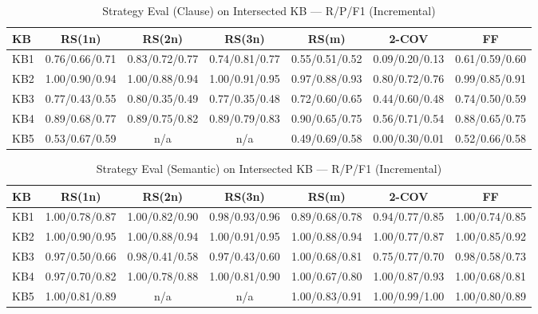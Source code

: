 \begin{table}[htbp]
\centering
\caption{Strategy Eval (Clause) on Intersected KB — R/P/F1 (Incremental)}
\label{tab:eval_clause_incremental}
\begin{tabular}{lcccccc}
\toprule
KB & RS(1n) & RS(2n) & RS(3n) & RS(m) & 2-COV & FF \\
\midrule
KB1 & 0.76/0.66/0.71 & 0.83/0.72/0.77 & 0.74/0.81/0.77 & 0.55/0.51/0.52 & 0.09/0.20/0.13 & 0.61/0.59/0.60 \\
KB2 & 1.00/0.90/0.94 & 1.00/0.88/0.94 & 1.00/0.91/0.95 & 0.97/0.88/0.93 & 0.80/0.72/0.76 & 0.99/0.85/0.91 \\
KB3 & 0.77/0.43/0.55 & 0.80/0.35/0.49 & 0.77/0.35/0.48 & 0.72/0.60/0.65 & 0.44/0.60/0.48 & 0.74/0.50/0.59 \\
KB4 & 0.89/0.68/0.77 & 0.89/0.75/0.82 & 0.89/0.79/0.83 & 0.90/0.65/0.75 & 0.56/0.71/0.54 & 0.88/0.65/0.75 \\
KB5 & 0.53/0.67/0.59 & n/a & n/a & 0.49/0.69/0.58 & 0.00/0.30/0.01 & 0.52/0.66/0.58 \\
\bottomrule
\end{tabular}
\end{table}

\begin{table}[htbp]
\centering
\caption{Strategy Eval (Semantic) on Intersected KB — R/P/F1 (Incremental)}
\label{tab:eval_semantic_incremental}
\begin{tabular}{lcccccc}
\toprule
KB & RS(1n) & RS(2n) & RS(3n) & RS(m) & 2-COV & FF \\
\midrule
KB1 & 1.00/0.78/0.87 & 1.00/0.82/0.90 & 0.98/0.93/0.96 & 0.89/0.68/0.78 & 0.94/0.77/0.85 & 1.00/0.74/0.85 \\
KB2 & 1.00/0.90/0.95 & 1.00/0.88/0.94 & 1.00/0.91/0.95 & 1.00/0.88/0.94 & 1.00/0.77/0.87 & 1.00/0.85/0.92 \\
KB3 & 0.97/0.50/0.66 & 0.98/0.41/0.58 & 0.97/0.43/0.60 & 1.00/0.68/0.81 & 0.75/0.77/0.70 & 0.98/0.58/0.73 \\
KB4 & 0.97/0.70/0.82 & 1.00/0.78/0.88 & 1.00/0.81/0.90 & 1.00/0.67/0.80 & 1.00/0.87/0.93 & 1.00/0.68/0.81 \\
KB5 & 1.00/0.81/0.89 & n/a & n/a & 1.00/0.83/0.91 & 1.00/0.99/1.00 & 1.00/0.80/0.89 \\
\bottomrule
\end{tabular}
\end{table}

